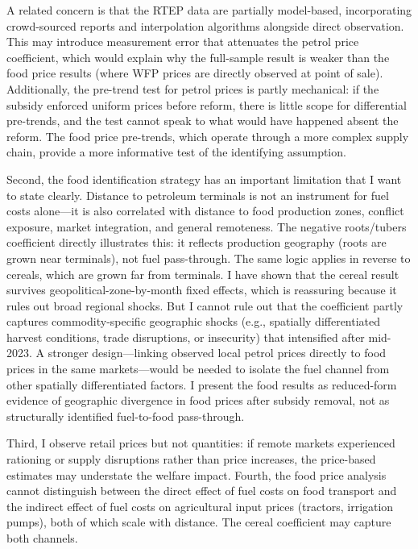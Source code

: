 \documentclass[12pt]{article}
\begin{document}
A related concern is that the RTEP data are partially model-based, incorporating crowd-sourced reports and interpolation algorithms alongside direct observation. This may introduce measurement error that attenuates the petrol price coefficient, which would explain why the full-sample result is weaker than the food price results (where WFP prices are directly observed at point of sale). Additionally, the pre-trend test for petrol prices is partly mechanical: if the subsidy enforced uniform prices before reform, there is little scope for differential pre-trends, and the test cannot speak to what would have happened absent the reform. The food price pre-trends, which operate through a more complex supply chain, provide a more informative test of the identifying assumption.

Second, the food identification strategy has an important limitation that I want to state clearly. Distance to petroleum terminals is not an instrument for fuel costs alone---it is also correlated with distance to food production zones, conflict exposure, market integration, and general remoteness. The negative roots/tubers coefficient directly illustrates this: it reflects production geography (roots are grown near terminals), not fuel pass-through. The same logic applies in reverse to cereals, which are grown far from terminals. I have shown that the cereal result survives geopolitical-zone-by-month fixed effects, which is reassuring because it rules out broad regional shocks. But I cannot rule out that the coefficient partly captures commodity-specific geographic shocks (e.g., spatially differentiated harvest conditions, trade disruptions, or insecurity) that intensified after mid-2023. A stronger design---linking observed local petrol prices directly to food prices in the same markets---would be needed to isolate the fuel channel from other spatially differentiated factors. I present the food results as reduced-form evidence of geographic divergence in food prices after subsidy removal, not as structurally identified fuel-to-food pass-through.

Third, I observe retail prices but not quantities: if remote markets experienced rationing or supply disruptions rather than price increases, the price-based estimates may understate the welfare impact. Fourth, the food price analysis cannot distinguish between the direct effect of fuel costs on food transport and the indirect effect of fuel costs on agricultural input prices (tractors, irrigation pumps), both of which scale with distance. The cereal coefficient may capture both channels.
\end{document}
